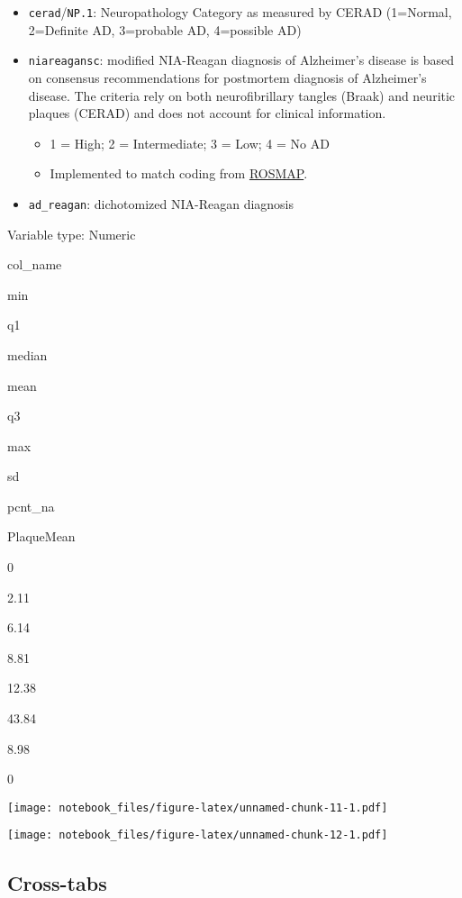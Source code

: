 \documentclass[]{book}
\providecommand{\tightlist}{%
  \setlength{\itemsep}{0pt}\setlength{\parskip}{0pt}}
\begin{document}
\begin{itemize}
\tightlist
\item
  \texttt{cerad}/\texttt{NP.1}: Neuropathology Category as measured by CERAD (1=Normal, 2=Definite AD, 3=probable AD, 4=possible AD)
\item
  \texttt{niareagansc}: modified NIA-Reagan diagnosis of Alzheimer's disease is based on consensus recommendations for postmortem diagnosis of Alzheimer's disease. The criteria rely on both neurofibrillary tangles (Braak) and neuritic plaques (CERAD) and does not account for clinical information.

  \begin{itemize}
  \tightlist
  \item
    1 = High; 2 = Intermediate; 3 = Low; 4 = No AD
  \item
    Implemented to match coding from
    \href{https://www.radc.rush.edu/docs/var/detail.htm?category=Pathology\&subcategory=Alzheimer\%27s+disease\&variable=niareagansc}{ROSMAP}.\\
  \end{itemize}
\item
  \texttt{ad\_reagan}: dichotomized NIA-Reagan diagnosis
\end{itemize}

\label{tab:msbb-path-numeric}Variable type: Numeric

col\_name

min

q1

median

mean

q3

max

sd

pcnt\_na

PlaqueMean

0

2.11

6.14

8.81

12.38

43.84

8.98

0

\texttt{[image: notebook\_files/figure-latex/unnamed-chunk-11-1.pdf]}

\hypertarget{htmlwidget-2e3682c30504189c5f2e}{}

\texttt{[image: notebook\_files/figure-latex/unnamed-chunk-12-1.pdf]}

\hypertarget{cross-tabs-2}{%
\subsection{Cross-tabs}\label{cross-tabs-2}}
\end{document}
